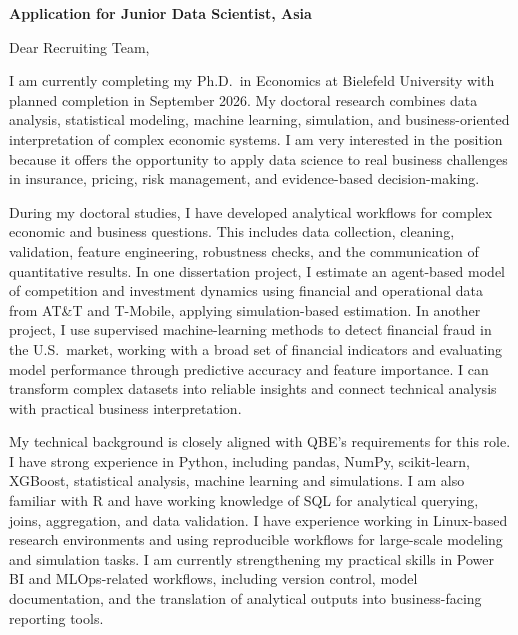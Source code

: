 \documentclass[11pt]{article}
\begin{document}
\vspace{0.1cm}

\noindent
\textbf{Application for Junior Data Scientist, Asia} \\

\vspace{0.05cm}

\noindent Dear Recruiting Team,

I am currently completing my Ph.D.\ in Economics at Bielefeld University with planned completion in September 2026. My doctoral research combines data analysis, statistical modeling, machine learning, simulation, and business-oriented interpretation of complex economic systems. I am very interested in the position because it offers the opportunity to apply data science to real business challenges in insurance, pricing, risk management, and evidence-based decision-making.

During my doctoral studies, I have developed analytical workflows for complex economic and business questions. This includes data collection, cleaning, validation, feature engineering, robustness checks, and the communication of quantitative results. In one dissertation project, I estimate an agent-based model of competition and investment dynamics using financial and operational data from AT\&T and T-Mobile, applying simulation-based estimation. In another project, I use supervised machine-learning methods to detect financial fraud in the U.S.\ market, working with a broad set of financial indicators and evaluating model performance through predictive accuracy and feature importance. I can transform complex datasets into reliable insights and connect technical analysis with practical business interpretation.

My technical background is closely aligned with QBE's requirements for this role. I have strong experience in Python, including pandas, NumPy, scikit-learn, XGBoost, statistical analysis, machine learning and simulations. I am also familiar with R and have working knowledge of SQL for analytical querying, joins, aggregation, and data validation. I have experience working in Linux-based research environments and using reproducible workflows for large-scale modeling and simulation tasks. I am currently strengthening my practical skills in Power BI and MLOps-related workflows, including version control, model documentation, and the translation of analytical outputs into business-facing reporting tools.
\end{document}
